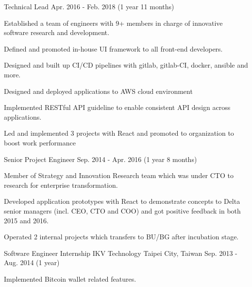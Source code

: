 \begin{cventries}
  \cventry
    {Technical Lead} %
    {} %
    {} %
    {Apr. 2016 - Feb. 2018 (1 year 11 months)} %
    {
      \begin{cvitems} %
        \item {Established a team of engineers with 9+ members in charge of innovative software research and development.}
        \item {Defined and promoted in-house UI framework to all front-end developers.}
        \item {Designed and built up CI/CD pipelines with gitlab, gitlab-CI, docker, ansible and more.}
        \item {Designed and deployed applications to AWS cloud environment}
        \item {Implemented RESTful API guideline to enable consistent API design across applications.}
        \item {Led and implemented 3 projects with React and promoted to organization to boost work performance}
      \end{cvitems}
    }

  \cventry
    {Senior Project Engineer} %
    {} %
    {} %
    {Sep. 2014 - Apr. 2016 (1 year 8 months)} %
    {
      \begin{cvitems} %
        \item {Member of Strategy and Innovation Research team which was under CTO to research for enterprise transformation.}
        \item {Developed application prototypes with React to demonstrate concepts to Delta senior managers (incl. CEO, CTO and COO) and got positive feedback in both 2015 and 2016.}
        \item {Operated 2 internal projects which transfers to BU/BG after incubation stage. }
      \end{cvitems}
    }

  \cventry
    {Software Engineer Internship} %
    {IKV Technology} %
    {Taipei City, Taiwan} %
    {Sep. 2013 - Aug. 2014 (1 year)} %
    {
      \begin{cvitems} %
        \item {Implemented Bitcoin wallet related features.}
      \end{cvitems}
    }


\end{cventries}
